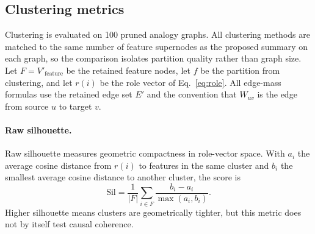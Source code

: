\documentclass[../main.tex]{subfiles}
\begin{document}

\subsection{Clustering metrics}
Clustering is evaluated on 100 pruned analogy graphs. All clustering methods are
matched to the same number of feature supernodes as the proposed summary on each
graph, so the comparison isolates partition quality rather than graph size. Let
$F = V'_{\text{feature}}$ be the retained feature nodes, let $f$ be the
partition from clustering, and let $r(i)$ be the role vector of
Eq.~\eqref{eq:role}. All edge-mass formulas use the retained edge set $E'$ and
the convention that $W_{uv}$ is the edge from source $u$ to target $v$.

\paragraph{Raw silhouette.}
Raw silhouette measures geometric compactness in role-vector space. With
$a_i$ the average cosine distance from $r(i)$ to features in the same cluster and
$b_i$ the smallest average cosine distance to another cluster, the score is
\begin{equation}
\mathrm{Sil}
=
\frac{1}{|F|}
\sum_{i \in F}
\frac{b_i - a_i}{\max(a_i, b_i)}.
\label{eq:metric-silhouette}
\end{equation}
Higher silhouette means clusters are geometrically tighter, but this metric does
not by itself test causal coherence.
\end{document}
